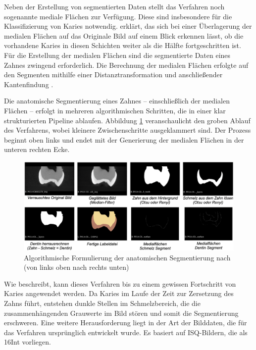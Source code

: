 Neben der Erstellung von segmentierten Daten stellt das Verfahren noch
sogenannte mediale Flächen zur Verfügung. Diese sind insbesondere für die Klassifizierung
von Karies notwendig. \citet[S.~42]{hoffmann2020} erklärt, das sich bei einer
Überlagerung der medialen Flächen auf das Originale Bild auf einem Blick
erkennen lässt, ob die vorhandene Karies in diesen Schichten weiter als die Hälfte
fortgeschritten ist. Für die Erstellung der medialen Flächen sind die
segmentierte Daten eines Zahnes zwingend erforderlich. Die Berechnung der medialen
Flächen erfolgte auf den Segmenten mithilfe einer Distanztransformation und anschließender
Kantenfindung \citep[vgl.][S.~42]{hoffmann2020}.

Die anatomische Segmentierung eines Zahnes – einschließlich der medialen Flächen
– erfolgt in mehreren algorithmischen Schritten, die in einer klar strukturierten
Pipeline ablaufen. Abbildung \ref{fig:anatomische_segmentierung} veranschaulicht
den groben Ablauf des Verfahrens, wobei kleinere Zwischenschritte ausgeklammert sind.
Der Prozess beginnt oben links und endet mit der Generierung der medialen
Flächen in der unteren rechten Ecke.

\begin{figure}[h]
	\centering
	\includegraphics[width=1\textwidth]{img/anatomischeSegmentierung.png}
	\caption{Algorithmische Formulierung der anatomischen Segmentierung nach
	\citet{hoffmann2020} (von links oben nach rechts unten)}
	\label{fig:anatomische_segmentierung}
\end{figure}

Wie \citet[S.~55]{hoffmann2020} beschreibt, kann dieses Verfahren bis zu einem gewissen
Fortschritt von Karies angewendet werden. Da Karies im Laufe der Zeit zur
Zersetzung des Zahns führt, entstehen dunkle Stellen im Schmelzbereich, die die
zusammenhängenden Grauwerte im Bild stören und somit die Segmentierung
erschweren. Eine weitere Herausforderung liegt in der Art der Bilddaten, die für
das Verfahren ursprünglich entwickelt wurde. Es basiert auf \ac{ISQ}-Bildern, die
als \ac{16Int} vorliegen.

